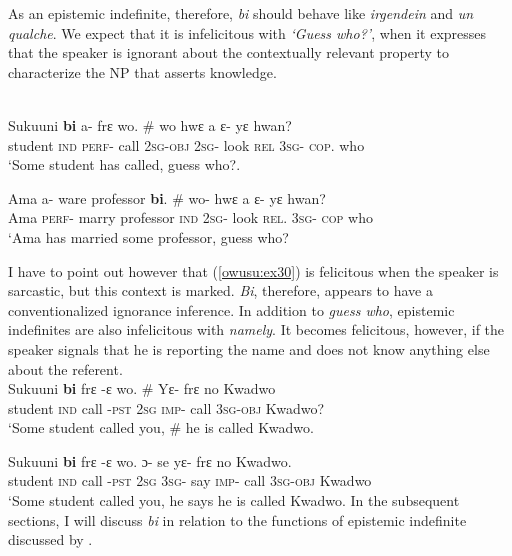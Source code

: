 \documentclass[output=paper,modfonts,nonflat,draftmode]{langsci/langscibook}
\begin{document}
 As an epistemic indefinite, therefore, \emph{bi} should behave like \emph{irgendein} and \emph{un qualche}. We expect that it is infelicitous with \emph{`Guess who?'}, when it expresses that the speaker is ignorant about the contextually relevant property to characterize the NP that asserts knowledge.  


\ea {}\\
 \ea\label{owusu:ex30}
 \gll Sukuuni \textbf{bi} a- frε wo. \# wo hwε a ε- yε hwan? \\
     student \textsc{ind} \textsc{perf}- call       \textsc{2sg}-\textsc{obj} {} \textsc{2sg}- look  \textsc{rel} \textsc{3sg}- \textsc{cop}. who \\
\glt `Some student has called, guess who?.

\ex \label{owusu:ex31}
\gll  Ama a- ware professor \textbf{bi}. \# wo- hwε a ε- yε hwan?\\
Ama \textsc{perf}- marry professor \textsc{ind} {} \textsc{2sg}- look  \textsc{rel}. \textsc{3sg}- \textsc{cop} who\\
\glt `Ama has married some professor, guess who?
\z\z 

I have to point out however that (\ref{owusu:ex30}) is felicitous when the speaker is sarcastic, but this context is marked. \emph{Bi}, therefore, appears to have a conventionalized ignorance inference. In addition to \emph{guess who}, epistemic indefinites are also infelicitous with \emph{namely}. It becomes felicitous, however, if the speaker signals that he is reporting the name and does not know anything else about the referent. 
\ea {}\\
\ea\label{owusu:ex32}
 \gll Sukuuni \textbf{bi} frε -ε wo. \# Yε- frε no Kwadwo\\
student \textsc{ind} call -\textsc{pst}  \textsc{2sg} {} \textsc{imp}- call  \textsc{3sg}-\textsc{obj} Kwadwo? \\
    
\glt `Some student called you, \# he is called Kwadwo.

\ex \label{owusu:ex33}
\gll  Sukuuni \textbf{bi} frε -ε wo. ɔ- se yε- frε no Kwadwo.\\
 student \textsc{ind} call -\textsc{pst}  \textsc{2sg} \textsc{3sg}- say \textsc{imp}- call  \textsc{3sg}-\textsc{obj} Kwadwo\\
\glt `Some student called you, he says he is called Kwadwo.
\z\z In the subsequent sections, I will discuss \emph{bi} in relation to the functions of epistemic indefinite discussed by  \citet{AloniPort2015}.
\end{document}
